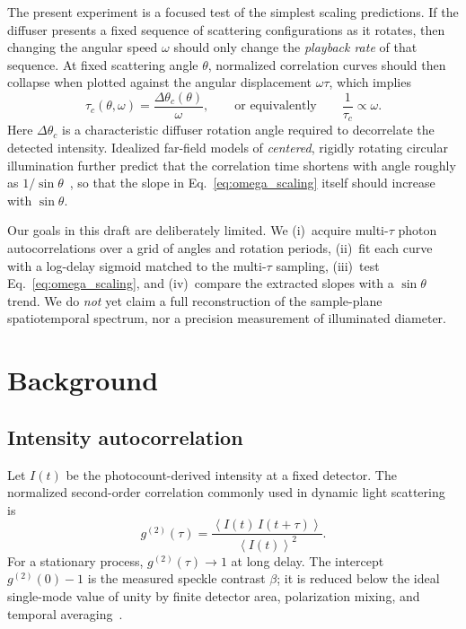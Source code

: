 \documentclass[11pt,letterpaper]{article}
\newcommand{\gtt}{g^{(2)}}
\newcommand{\avg}[1]{\left\langle #1 \right\rangle}
\begin{document}
The present experiment is a focused test of the simplest scaling predictions.
If the diffuser presents a fixed sequence of scattering configurations as it
rotates, then changing the angular speed $\omega$ should only change the
\emph{playback rate} of that sequence. At fixed scattering angle $\theta$,
normalized correlation curves should then collapse when plotted against the
angular displacement $\omega\tau$, which implies
\begin{equation}
  \tau_c(\theta,\omega)
  =
  \frac{\Delta\theta_c(\theta)}{\omega},
  \qquad\text{or equivalently}\qquad
  \frac{1}{\tau_c}
  \propto
  \omega.
  \label{eq:omega_scaling}
\end{equation}
Here $\Delta\theta_c$ is a characteristic diffuser rotation angle required to
decorrelate the detected intensity. Idealized far-field models of
\emph{centered}, rigidly rotating circular illumination further predict that
the correlation time shortens with angle roughly as
$1/\sin\theta$~\cite{Churnside1982,Yura1998}, so that the slope in
Eq.~\eqref{eq:omega_scaling} itself should increase with $\sin\theta$.

Our goals in this draft are deliberately limited. We (i)~acquire multi-$\tau$
photon autocorrelations over a grid of angles and rotation periods,
(ii)~fit each curve with a log-delay sigmoid matched to the multi-$\tau$
sampling, (iii)~test Eq.~\eqref{eq:omega_scaling}, and (iv)~compare the
extracted slopes with a $\sin\theta$ trend. We do \emph{not} yet claim a full
reconstruction of the sample-plane spatiotemporal spectrum, nor a precision
measurement of illuminated diameter.

\section{Background}
\label{sec:background}

\subsection{Intensity autocorrelation}

Let $I(t)$ be the photocount-derived intensity at a fixed detector. The
normalized second-order correlation commonly used in dynamic light
scattering~\cite{BernePecoraBook,Schatzel1990} is
\begin{equation}
  \gtt(\tau)
  =
  \frac{\avg{I(t)\,I(t+\tau)}}{\avg{I(t)}^2}.
  \label{eq:g2}
\end{equation}
For a stationary process, $\gtt(\tau)\to 1$ at long delay. The intercept
$\gtt(0)-1$ is the measured speckle contrast $\beta$; it is reduced below the
ideal single-mode value of unity by finite detector area, polarization mixing,
and temporal averaging~\cite{GoodmanSpeckle}.
\end{document}
